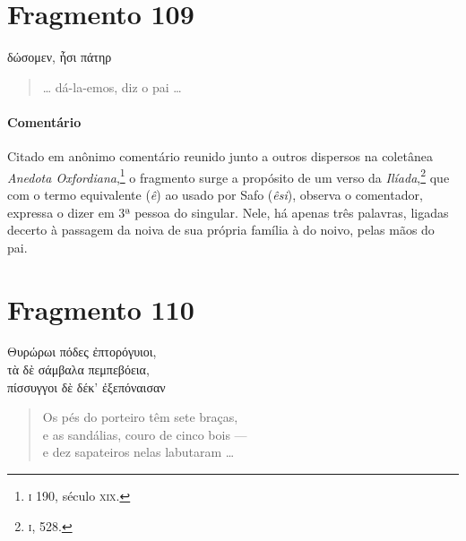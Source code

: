 \section{Fragmento 109}

\begin{gkverse}
δώσομεν, ἦσι πάτηρ
\end{gkverse}

\begin{verse}
\ldots{} dá-la-emos, diz o pai \ldots{}
\end{verse}

\medskip

\paragraph{Comentário} Citado em anônimo comentário reunido junto a outros dispersos na coletânea \emph{Anedota Oxfordiana},\footnote{\textsc{i} 190, século \textsc{xix}.} o fragmento surge a propósito de um verso da \emph{Ilíada},\footnote{\textsc{i}, 528.} que com o termo equivalente (\emph{ê}) ao usado por Safo (\emph{êsi}), observa o comentador, expressa o dizer em 3ª pessoa do singular. Nele, há apenas três palavras, ligadas decerto à passagem da noiva de sua própria família à do noivo, pelas mãos do pai.


\section{Fragmento 110}

\begin{gkverse}
Θυρώρωι πόδες ἐπτορόγυιοι,\\
τὰ δὲ σάμβαλα πεμπεβόεια,\\
πίσσυγγοι δὲ δέκ’ ἐξεπόναισαν
\end{gkverse}

\begin{verse}
Os pés do porteiro têm sete braças,\\
e as sandálias, couro de cinco bois --- \\
e dez sapateiros nelas labutaram \ldots{}
\end{verse}

\medskip


